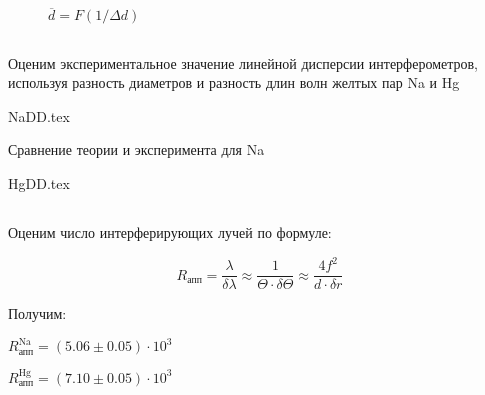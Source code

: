\begin{figure}[h!]
  \caption{$\overline{d} = F(1/\Delta d)$}
  \label{img::avg_diam_na}
\end{figure}

\newpage

\subsection{}

Оценим экспериментальное значение линейной дисперсии интерферометров,
используя разность диаметров и разность длин волн желтых пар Na и Hg

\begin{table}[h!]
  \begin{center}
    {NaDD.tex}
  \end{center}
  \caption{Сравнение теории и эксперимента для Na}
\end{table}

{HgDD.tex}

\subsection{}

Оценим число интерферирующих лучей по формуле:

$$
R_{\text{апп}} =  \frac{\lambda}{\delta \lambda} \approx \frac{1}{\Theta \cdot \delta \Theta} \approx \frac{4 f^2}{d \cdot \delta r}
$$

Получим:

$R_{\text{апп}}^{\text{Na}} = (5.06 \pm 0.05 ) \cdot 10^3$

$R_{\text{апп}}^{\text{Hg}} = (7.10 \pm 0.05 ) \cdot 10^3$



